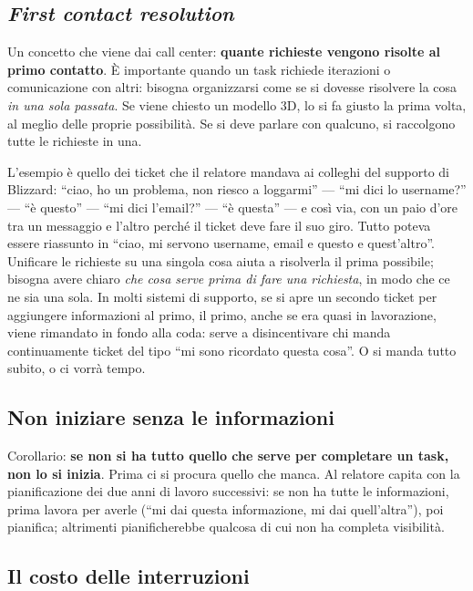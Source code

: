 \subsection{\emph{First contact resolution}}

Un concetto che viene dai call center: \textbf{quante richieste vengono risolte
al primo contatto}. È importante quando un task richiede iterazioni o
comunicazione con altri: bisogna organizzarsi come se si dovesse risolvere la
cosa \emph{in una sola passata}. Se viene chiesto un modello 3D, lo si fa giusto
la prima volta, al meglio delle proprie possibilità. Se si deve parlare con
qualcuno, si raccolgono tutte le richieste in una.

L'esempio è quello dei ticket che il relatore mandava ai colleghi del supporto di
Blizzard: ``ciao, ho un problema, non riesco a loggarmi'' --- ``mi dici lo
username?'' --- ``è questo'' --- ``mi dici l'email?'' --- ``è questa'' --- e così
via, con un paio d'ore tra un messaggio e l'altro perché il ticket deve fare il
suo giro. Tutto poteva essere riassunto in ``ciao, mi servono username, email e
questo e quest'altro''. Unificare le richieste su una singola cosa aiuta a
risolverla il prima possibile; bisogna avere chiaro \emph{che cosa serve prima
di fare una richiesta}, in modo che ce ne sia una sola. In molti sistemi di
supporto, se si apre un secondo ticket per aggiungere informazioni al primo, il
primo, anche se era quasi in lavorazione, viene rimandato in fondo alla coda:
serve a disincentivare chi manda continuamente ticket del tipo ``mi sono
ricordato questa cosa''. O si manda tutto subito, o ci vorrà tempo.

\subsection{Non iniziare senza le informazioni}

Corollario: \textbf{se non si ha tutto quello che serve per completare un task,
non lo si inizia}. Prima ci si procura quello che manca. Al relatore capita con
la pianificazione dei due anni di lavoro successivi: se non ha tutte le
informazioni, prima lavora per averle (``mi dai questa informazione, mi dai
quell'altra''), poi pianifica; altrimenti pianificherebbe qualcosa di cui non ha
completa visibilità.

\subsection{Il costo delle interruzioni}

